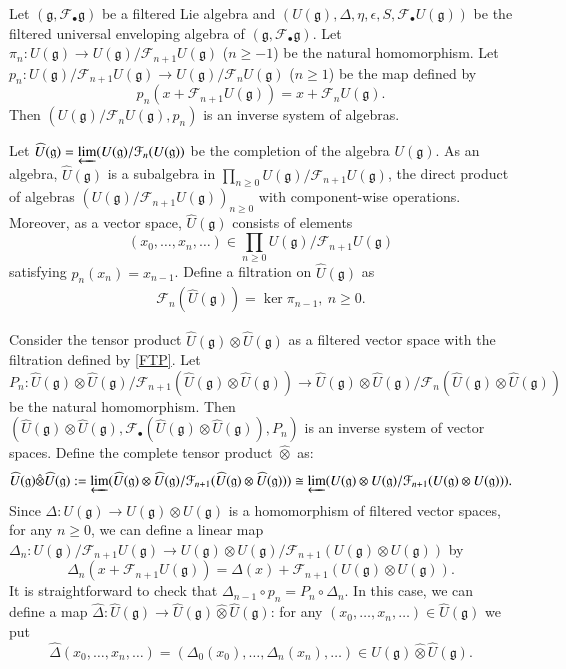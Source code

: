 \documentclass[12pt]{amsart}
\theoremstyle{definition}   %
\newcommand{\g}{\mathfrak g}
\newcommand{\huaF}{\mathcal{F}}
\begin{document}
Let $(\g,\huaF_{\bullet}\g)$ be a filtered Lie algebra and $(U(\g),\Delta,\eta,\epsilon, S,\huaF_{\bullet}U(\g))$ be the filtered universal enveloping algebra of $(\g,\huaF_{\bullet}\g)$.
Let $\pi_n: U(\mathfrak g)\rightarrow U(\g)/\huaF_{n+1}U(\mathfrak g)$ ($n\geq -1$) be the natural homomorphism. Let  $p_n: U(\mathfrak g)/\huaF_{n+1}U(\mathfrak g)\rightarrow U(\mathfrak g)/\huaF_nU(\mathfrak g)$ ($n\geq 1$) be the map defined by
$$
p_n(x+\huaF_{n+1}U(\mathfrak g))=x+\huaF_nU(\mathfrak g).
$$
Then $(U(\mathfrak g)/\huaF_nU(\mathfrak g), p_n)$ is an inverse system of algebras.

Let $\widehat{U}(\g)=\varprojlim (U(\mathfrak g)/\huaF_n(U(\mathfrak g))$  be the completion of the algebra $U(\mathfrak g)$. As an algebra, $\widehat{U}(\g)$ is a subalgebra in $\prod\limits_{n\geq 0} U(\mathfrak g)/\huaF_{n+1} U(\mathfrak g)$, the direct product of algebras $\left(U(\mathfrak g)/\huaF_{n+1} U(\mathfrak g)\right)_{n\geq 0}$ with component-wise operations. Moreover, as a vector space, $\widehat{U}(\g)$ consists of elements $$(x_0,\ldots,x_n,\ldots)\in \prod\limits_{n\geq 0} U(\mathfrak g)/\huaF_{n+1} U(\mathfrak g) $$ satisfying $p_n(x_n)=x_{n-1}$. Define a filtration on $\widehat{U}(\g)$ as
\begin{eqnarray}
\huaF_n(\widehat{U}(\g))=\ker \pi_{n-1},\ n\geq 0.
\end{eqnarray}

Consider the tensor product $\widehat{U}(\g)\otimes\widehat{U}(\g)$ as a filtered vector space with the filtration defined by \eqref{FTP}. Let $P_n:\widehat{U}(\g)\otimes\widehat{U}(\g)/\huaF_{n+1}(\widehat{U}(\g)\otimes\widehat{U}(\g))\rightarrow  \widehat{U}(\g)\otimes\widehat{U}(\g)/\huaF_{n}(\widehat{U}(\g)\otimes\widehat{U}(\g))$ be the natural homomorphism.   Then $(\widehat{U}(\g)\otimes\widehat{U}(\g), \huaF_{\bullet}(\widehat{U}(\g)\otimes\widehat{U}(\g)),P_n)$ is an inverse system of vector spaces. Define the complete tensor product $\hat{\otimes}$ as:
$$\widehat{U}(\g)\hat{\otimes}\widehat{U}(\g):=\varprojlim (\widehat{U}(\g)\otimes \widehat{U}(\g)/\huaF_{n+1}(\widehat{U}(\g)\otimes\widehat{U}(\g)))\cong\varprojlim ({U}(\g)\otimes {U}(\g)/\huaF_{n+1}({U}(\g)\otimes{U}(\g))).$$
Since {$\Delta: U(\g)\rightarrow U(\g)\otimes U(\g)$ is a homomorphism of filtered vector spaces}, for any $n\geq 0$,  we can define a   linear map  $\Delta_n: U(\mathfrak g)/\huaF_{n+1} U(\mathfrak g)\rightarrow U(\mathfrak g)\otimes U(\mathfrak g)/\huaF_{n+1}\left (U(\mathfrak g)\otimes U(\mathfrak g)\right)$
by
$$
\Delta_n(x+\huaF_{n+1}U(\mathfrak g))=\Delta(x)+\huaF_{n+1}\left (U(\mathfrak g)\otimes U(\mathfrak g)\right).
$$
It is straightforward to check that $\Delta_{n-1}\circ p_n=P_n\circ \Delta_n$. In this case, we can define a map $\widehat{\Delta}:\widehat{U}(\g)\rightarrow \widehat{U}(\g)\hat{\otimes}\widehat{U}(\g)$: for any $(x_0,\ldots,x_n,\ldots)\in \widehat{U}(\g)$ we put
$$
\widehat{\Delta}(x_0,\ldots,x_n,\ldots)=(\Delta_0(x_0),\ldots,\Delta_n(x_n),\ldots)\in \widehat{U}(\g)\hat{\otimes}\widehat{U}(\g).
$$
\end{document}
